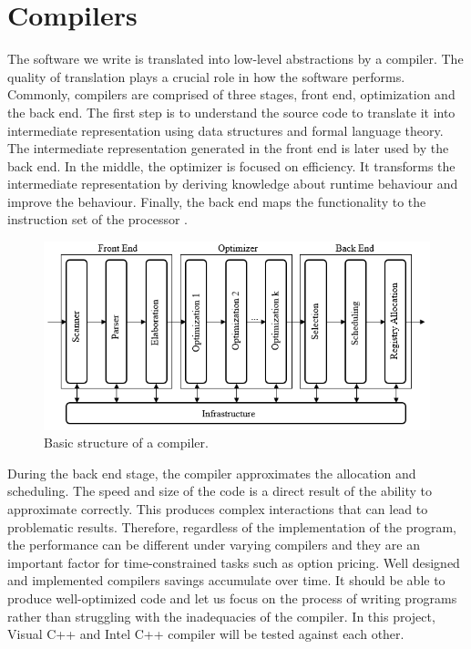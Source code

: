 \documentclass[12pt, oneside]{book}
\theoremstyle{plain}
\theoremstyle{definition}
\begin{document}
\section{Compilers}
The software we write is translated into low-level abstractions by a compiler. The quality of translation plays a crucial role in how the software performs. Commonly, compilers are comprised of three stages, front end, optimization and the back end.  The first step is to understand the source code to translate it into intermediate representation using data structures and formal language theory. The intermediate representation generated in the front end is later used by the back end. In the middle, the optimizer is focused on efficiency. It transforms the intermediate representation by deriving knowledge about runtime behaviour and improve the behaviour. Finally, the back end maps the functionality to the instruction set of the processor \cite{compiler}. 

\begin{figure}[!htb]
    \centering
        \includegraphics[scale=1]{compiler.png}
    \caption{Basic structure of a compiler.}
\end{figure}

During the back end stage, the compiler approximates the allocation and scheduling. The speed and size of the code is a direct result of the ability to approximate correctly. This produces complex interactions that can lead to problematic results. Therefore, regardless of the implementation of the program, the performance can be different under varying compilers and they are an important factor for time-constrained tasks such as option pricing.  Well designed and implemented compilers savings accumulate over time. It should be able to produce well-optimized code and let us focus on the process of writing programs rather than struggling with the inadequacies of the compiler.  In this project, Visual C++ and Intel C++ compiler will be tested against each other. 
\end{document}
